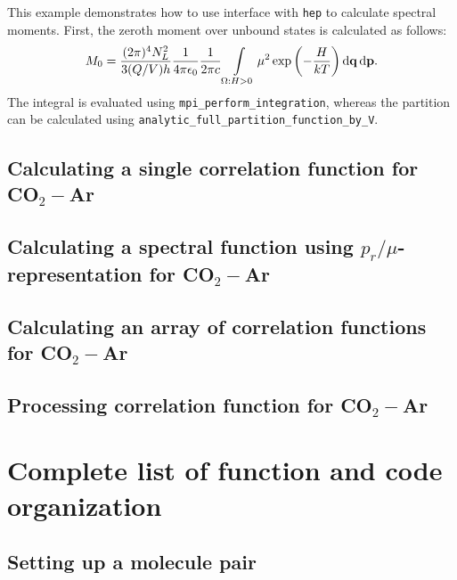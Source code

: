 \documentclass{article}
\newcommand{\lb}{\left(}
\newcommand{\rb}{\right)}
\newcommand{\mf}{\mathbf}
\newcommand*\diff{\mathop{}\!\mathrm{d}}
\begin{document}
This example demonstrates how to use interface with \texttt{hep} to calculate spectral moments. 
First, the zeroth moment over unbound states is calculated as follows:
\begin{gather}
    M_0 = \frac{(2 \pi)^4 N_L^2}{3 (Q/V) h} \frac{1}{4 \pi \epsilon_0} \frac{1}{2 \pi c} \int\limits_{\Omega: H > 0} \mu^2 \exp \lb -\frac{H}{kT} \rb \diff{\mf{q}} \diff{\mf{p}}. \notag
\end{gather}
%
The integral is evaluated using \texttt{mpi\_perform\_integration}, whereas the partition can be calculated using \texttt{analytic\_full\_partition\_function\_by\_V}.    


\subsection{Calculating a single correlation function for CO$_2-$Ar}
\label{subsec:example-correlation-co2-ar}

\subsection{Calculating a spectral function using $p_r/\mu$-representation for CO$_2-$Ar}
\label{subsec:example-prmu-co2-ar}

\subsection{Calculating an array of correlation functions for CO$_2-$Ar}
\label{subsec:example-correlation-array-co2-ar}

\subsection{Processing correlation function for CO$_2-$Ar}
\label{subsec:example-processing}


\section{Complete list of function and code organization}
\label{sec:code-organization}


\subsection{Setting up a molecule pair}
\label{subsec:module-hawaii}
\end{document}
